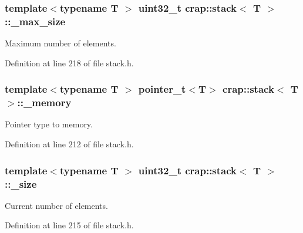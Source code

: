 \subsubsection[{\+\_\+max\+\_\+size}]{\setlength{\rightskip}{0pt plus 5cm}template$<$typename T $>$ uint32\+\_\+t {\bf crap\+::stack}$<$ T $>$\+::\+\_\+max\+\_\+size\hspace{0.3cm}{\ttfamily [protected]}}\label{classcrap_1_1stack_a8b25592c44ee432f58fb257486e6a9ed}


Maximum number of elements. 



Definition at line 218 of file stack.\+h.

\hypertarget{classcrap_1_1stack_a17d0a7ca9c3ad25e5b88a8db05a012c1}{}
\subsubsection[{\+\_\+memory}]{\setlength{\rightskip}{0pt plus 5cm}template$<$typename T $>$ {\bf pointer\+\_\+t}$<$T$>$ {\bf crap\+::stack}$<$ T $>$\+::\+\_\+memory\hspace{0.3cm}{\ttfamily [protected]}}\label{classcrap_1_1stack_a17d0a7ca9c3ad25e5b88a8db05a012c1}


Pointer type to memory. 



Definition at line 212 of file stack.\+h.

\hypertarget{classcrap_1_1stack_abe6a488b2ad11080547b96edb5991e15}{}
\subsubsection[{\+\_\+size}]{\setlength{\rightskip}{0pt plus 5cm}template$<$typename T $>$ uint32\+\_\+t {\bf crap\+::stack}$<$ T $>$\+::\+\_\+size\hspace{0.3cm}{\ttfamily [protected]}}\label{classcrap_1_1stack_abe6a488b2ad11080547b96edb5991e15}


Current number of elements. 



Definition at line 215 of file stack.\+h.

\hypertarget{classcrap_1_1stack_a35cffde292cd6f37a07a5dc5fceed1bf}{}

